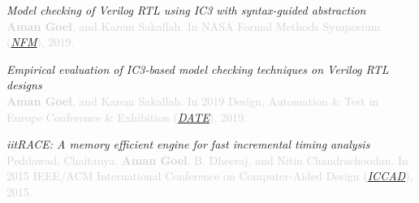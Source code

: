 \documentclass[margin,line,letter]{resume}
\begin{document}
\begin{resume}
\hspace{-2em} \href{https://link.springer.com/chapter/10.1007/978-3-030-20652-9_11}{\faFilePdfO} \hspace{0.3em}
\textit{Model checking of Verilog RTL using IC3 with syntax-guided abstraction} \\
\textcolor{lightgray}{\textbf{Aman Goel}, and Karem Sakallah. In NASA Formal Methods Symposium (\href{https://robonaut.jsc.nasa.gov/R2/pages/nfm2019.html}{\textit{NFM}}), 2019.}

\hspace{-2em} \href{https://ieeexplore.ieee.org/abstract/document/8715289}{\faFilePdfO} \hspace{0.3em}
\textit{Empirical evaluation of IC3-based model checking techniques on Verilog RTL designs} \\
\textcolor{lightgray}{\textbf{Aman Goel}, and Karem Sakallah. In 2019 Design, Automation \& Test in Europe Conference \& Exhibition (\href{https://www.date-conference.com/}{\textit{DATE}}), 2019.}

\hspace{-2em} \href{https://ieeexplore.ieee.org/abstract/document/7372667}{\faFilePdfO} \hspace{0.3em}
\textit{iitRACE: A memory efficient engine for fast incremental timing analysis} \\
\textcolor{lightgray}{Peddawad, Chaitanya, \textbf{Aman Goel}, B. Dheeraj, and Nitin Chandrachoodan. In 2015 IEEE/ACM International Conference on Computer-Aided Design (\href{https://iccad.com/}{\textit{ICCAD}}), 2015.}


\end{resume}
\end{document}
